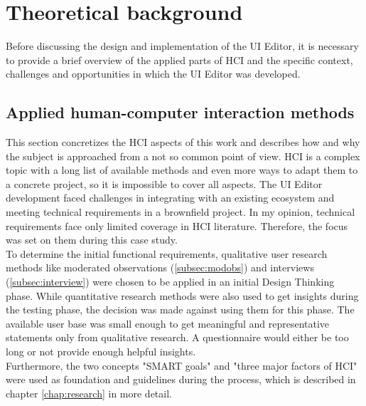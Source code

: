 
%
\chapter{Theoretical background}
\label{chap:background}

Before discussing the design and implementation of the UI Editor, it is necessary to provide a brief overview of the applied parts of HCI and the specific context, challenges and opportunities in which the UI Editor was developed.
% 

\section{Applied human-computer interaction methods}

This section concretizes the HCI aspects of this work and describes how and why the subject is approached from a not so common point of view.
HCI is a complex topic with a long list of available methods and even more ways to adapt them to a concrete project, so it is impossible to cover all aspects.
The UI Editor development faced challenges in integrating with an existing ecosystem and meeting technical requirements in a \gls{brownfield} project.
In my opinion, technical requirements face only limited coverage in HCI literature.
Therefore, the focus was set on them during this case study.
\\
To determine the initial functional requirements, qualitative user research methods like moderated observations (\ref{subsec:modobs}) and interviews (\ref{subsec:interview}) were chosen to be applied in an initial Design Thinking phase.
While quantitative research methods were also used to get insights during the testing phase, the decision was made against using them for this phase.
The available user base was small enough to get meaningful and representative statements only from qualitative research.
A questionnaire would either be too long or not provide enough helpful insights.
\\
Furthermore, the two concepts "SMART goals" and "three major factors of HCI" were used as foundation and guidelines during the process, which is described in chapter \ref{chap:research} in more detail.

